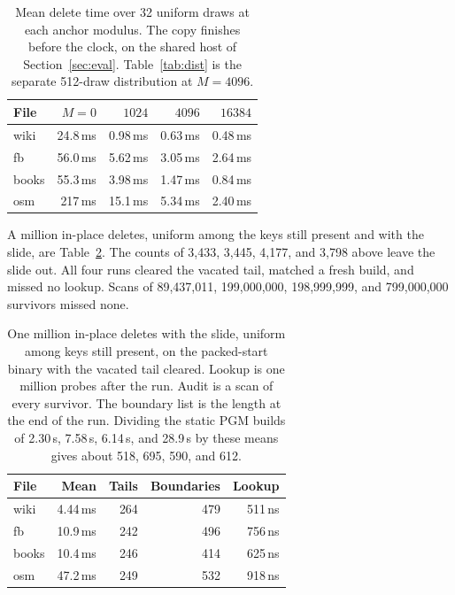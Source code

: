 \documentclass[conference]{IEEEtran}
\begin{document}
\begin{table}[t]
\caption{Mean delete time over 32 uniform draws at each anchor modulus.
The copy finishes before the clock, on the shared host of Section~\ref{sec:eval}.
Table~\ref{tab:dist} is the separate 512-draw distribution at $M=4096$.}
\label{tab:modtime}
\centering
\footnotesize
\begin{tabular}{@{}lrrrr@{}}
\toprule
File & $M=0$ & $1024$ & $4096$ & $16384$ \\
\midrule
wiki  & 24.8\,ms & 0.98\,ms & 0.63\,ms & 0.48\,ms \\
fb    & 56.0\,ms & 5.62\,ms & 3.05\,ms & 2.64\,ms \\
books & 55.3\,ms & 3.98\,ms & 1.47\,ms & 0.84\,ms \\
osm   & 217\,ms & 15.1\,ms & 5.34\,ms & 2.40\,ms \\
\bottomrule
\end{tabular}
\end{table}

A million in-place deletes, uniform among the keys still present and with the slide, are Table~\ref{tab:million}.
The counts of 3{,}433, 3{,}445, 4{,}177, and 3{,}798 above leave the slide out.
All four runs cleared the vacated tail, matched a fresh build, and missed no lookup.
Scans of 89{,}437{,}011, 199{,}000{,}000, 198{,}999{,}999, and 799{,}000{,}000 survivors missed none.

\begin{table}[t]
\caption{One million in-place deletes with the slide, uniform among keys still present, on the packed-start binary with the vacated tail cleared.
Lookup is one million probes after the run.
Audit is a scan of every survivor.
The boundary list is the length at the end of the run.
Dividing the static PGM builds of 2.30\,s, 7.58\,s, 6.14\,s, and 28.9\,s by these means gives about 518, 695, 590, and 612.}
\label{tab:million}
\centering
\scriptsize
\begin{tabular}{@{}lrrrr@{}}
\toprule
File & Mean & Tails & Boundaries & Lookup \\
\midrule
wiki  & 4.44\,ms & 264 & 479 & 511\,ns \\
fb    & 10.9\,ms & 242 & 496 & 756\,ns \\
books & 10.4\,ms & 246 & 414 & 625\,ns \\
osm   & 47.2\,ms & 249 & 532 & 918\,ns \\
\bottomrule
\end{tabular}
\end{table}
\end{document}
